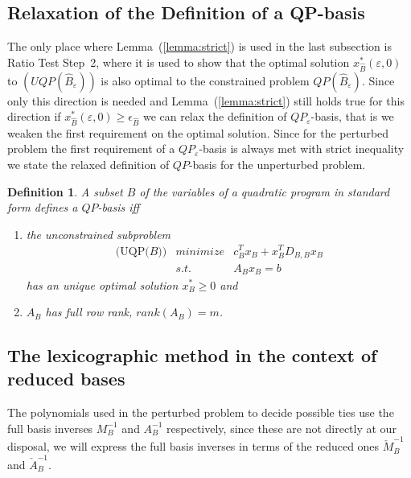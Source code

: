 \documentclass[a4paper]{article}
\newtheorem{definition}{Definition}
\begin{document}
\subsection{Relaxation of the Definition of a QP-basis}
The only place where Lemma~(\ref{lemma:strict}) is used in the last subsection
is Ratio Test Step~2, where it is used to show that the optimal solution
$x_{\hat{B}}^{*}(\varepsilon, 0)$ to $(UQP(\hat{B}_{\varepsilon}))$
is also optimal to the constrained problem $QP(\hat{B}_{\varepsilon})$.
Since only this direction is needed and Lemma~(\ref{lemma:strict}) still holds
true for this direction if
$x_{\hat{B}}^{*}(\varepsilon, 0) \geq \epsilon_{\hat{B}}$
we can relax the definition of $QP_{\varepsilon}$-basis, that is we
weaken the first requirement on the optimal solution. Since for the
perturbed problem the first requirement of a $QP_{\varepsilon}$-basis is always
met with strict inequality we state the relaxed definition of $QP$-basis for
the unperturbed problem.  
\begin{definition}
A subset $B$ of the variables of a quadratic program in standard form defines
a $QP$-basis iff
\begin{enumerate}
  \item the unconstrained subproblem
    \begin{eqnarray}
      \mbox{(UQP($B$))} & minimize & c_{B}^{T}x_{B} 
        + x_{B}^{T}D_{B, B}
	x_{B}  \nonumber\\
\label{eq:QP_basis_feasibility_B}
      & s.t.  &A_{B} x_{B} = b
    \end{eqnarray}
    has an unique optimal solution $x_{B}^{*} \geq 0$ and 
  \item $A_{B}$ has full row rank, $rank(A_{B})=m$. 
\end{enumerate}
\end{definition}

\subsection{The lexicographic method in the context of reduced bases}
The polynomials used in the perturbed problem to decide possible ties use
the full basis inverses $M_{B}^{-1}$ and $A_{B}^{-1}$ respectively, since these
are not directly at our disposal, we will express the full basis inverses in
terms of the reduced ones $\check{M}_{B}^{-1}$ and $\check{A}_{B}^{-1}$.
\end{document}
